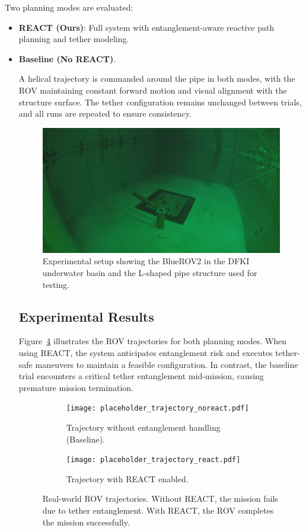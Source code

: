 Two planning modes are evaluated:
\begin{itemize}
    \item \textbf{REACT (Ours)}: Full system with entanglement-aware reactive path planning and tether modeling.
    \item \textbf{Baseline (No REACT)}.

A helical trajectory is commanded around the pipe in both modes, with the ROV maintaining constant forward motion and visual alignment with the structure surface. The tether configuration remains unchanged between trials, and all runs are repeated to ensure consistency.

\begin{figure}[ht]
    \centering
    \includegraphics[width=0.5\linewidth]{Phd_thesis/figures/pipe.JPG}
    \caption{Experimental setup showing the BlueROV2 in the DFKI underwater basin and the L-shaped pipe structure used for testing.}
    \label{fig:realworld_setup}
\end{figure}

\subsection{Experimental Results}

Figure~\ref{fig:realworld_trajectory} illustrates the ROV trajectories for both planning modes. When using REACT, the system anticipates entanglement risk and executes tether-safe maneuvers to maintain a feasible configuration. In contrast, the baseline trial encounters a critical tether entanglement mid-mission, causing premature mission termination.

\begin{figure}[ht]
    \centering
    \begin{subfigure}[b]{0.48\linewidth}
        \centering
        \texttt{[image: placeholder\_trajectory\_noreact.pdf]}
        \caption{Trajectory without entanglement handling (Baseline).}
        \label{fig:traj_noreact}
    \end{subfigure}
    \hfill
    \begin{subfigure}[b]{0.48\linewidth}
        \centering
        \texttt{[image: placeholder\_trajectory\_react.pdf]}
        \caption{Trajectory with \ac{REACT} enabled.}
        \label{fig:traj_react}
    \end{subfigure}
    \caption{Real-world ROV trajectories. Without REACT, the mission fails due to tether entanglement. With REACT, the ROV completes the mission successfully.}
    \label{fig:realworld_trajectory}
\end{figure}


\end{itemize}
